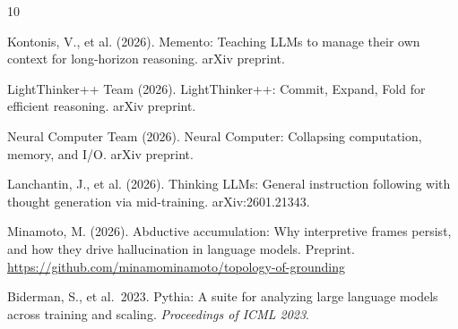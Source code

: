 \documentclass[12pt]{article}
\begin{document}

\begin{thebibliography}{10}

Kontonis, V., et al. (2026).
Memento: Teaching LLMs to manage their own context for long-horizon
reasoning.
arXiv preprint.

LightThinker++ Team (2026).
LightThinker++: Commit, Expand, Fold for efficient reasoning.
arXiv preprint.

Neural Computer Team (2026).
Neural Computer: Collapsing computation, memory, and I/O.
arXiv preprint.

Lanchantin, J., et al. (2026).
Thinking LLMs: General instruction following with thought generation
via mid-training.
arXiv:2601.21343.

Minamoto, M. (2026).
Abductive accumulation: Why interpretive frames persist, and how they
drive hallucination in language models.
Preprint.
\url{https://github.com/minamominamoto/topology-of-grounding}

Biderman, S., et al.\ 2023.
Pythia: A suite for analyzing large language models across training
and scaling.
\textit{Proceedings of ICML 2023}.

\end{thebibliography}
\end{document}
